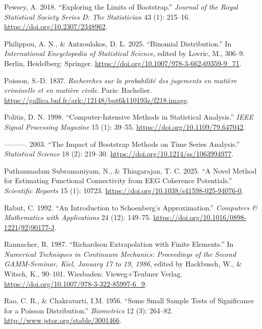 \documentclass[
]{article}
\newlength{\cslhangindent}
\newlength{\cslentryspacingunit} %
\newenvironment{CSLReferences}[2] %
 {%
  \setlength{\parindent}{0pt}
  \ifodd #1
  \let\oldpar\par
  \def\par{\hangindent=\cslhangindent\oldpar}
  \fi
  \setlength{\parskip}{#2\cslentryspacingunit}
 }%
 {}
\begin{document}
\begin{CSLReferences}{1}{0}
\leavevmode{}%
Pewsey, A. 2018. {``Exploring the Limits of Bootstrap.''} \emph{Journal
of the Royal Statistical Society Series D: The Statistician} 43 (1):
215--16. \url{https://doi.org/10.2307/2348962}.

\leavevmode{}%
Philippou, A. N., \& Antzoulakos, D. L. 2025. {``Binomial
Distribution.''} In \emph{International Encyclopedia of Statistical
Science}, edited by Lovric, M., 306--9. Berlin, Heidelberg: Springer.
\url{https://doi.org/10.1007/978-3-662-69359-9_71}.

\leavevmode{}%
Poisson, S.-D. 1837. \emph{{Recherches sur la probabilité des jugements
en matière criminelle et en matière civile}}. Paris: Bachelier.
\url{https://gallica.bnf.fr/ark:/12148/bpt6k110193z/f218.image}.

\leavevmode{}%
Politis, D. N. 1998. {``Computer-Intensive Methods in Statistical
Analysis.''} \emph{IEEE Signal Processing Magazine} 15 (1): 39--55.
\url{https://doi.org/10.1109/79.647042}.

\leavevmode{}%
---------. 2003. {``The Impact of Bootstrap Methods on Time Series
Analysis.''} \emph{Statistical Science} 18 (2): 219--30.
\url{https://doi.org/10.1214/ss/1063994977}.

\leavevmode{}%
Puthanmadam Subramaniyam, N., \& Thiagarajan, T. C. 2025. {``A Novel
Method for Estimating Functional Connectivity from EEG Coherence
Potentials.''} \emph{Scientific Reports} 15 (1): 10723.
\url{https://doi.org/10.1038/s41598-025-94076-0}.

\leavevmode{}%
Rabut, C. 1992. {``An Introduction to Schoenberg's Approximation.''}
\emph{Computers \& Mathematics with Applications} 24 (12): 149--75.
\url{https://doi.org/10.1016/0898-1221(92)90177-J}.

\leavevmode{}%
Rannacher, R. 1987. {``Richardson Extrapolation with Finite Elements.''}
In \emph{Numerical Techniques in Continuum Mechanics: Proceedings of the
Second GAMM-Seminar, Kiel, January 17 to 19, 1986}, edited by Hackbusch,
W., \& Witsch, K., 90--101. Wiesbaden: Vieweg+Teubner Verlag.
\url{https://doi.org/10.1007/978-3-322-85997-6_9}.

\leavevmode{}%
Rao, C. R., \& Chakravarti, I.M. 1956. {``Some Small Sample Tests of
Significance for a Poisson Distribution.''} \emph{Biometrics} 12 (3):
264--82. \url{http://www.jstor.org/stable/3001466}.


\end{CSLReferences}
\end{document}
